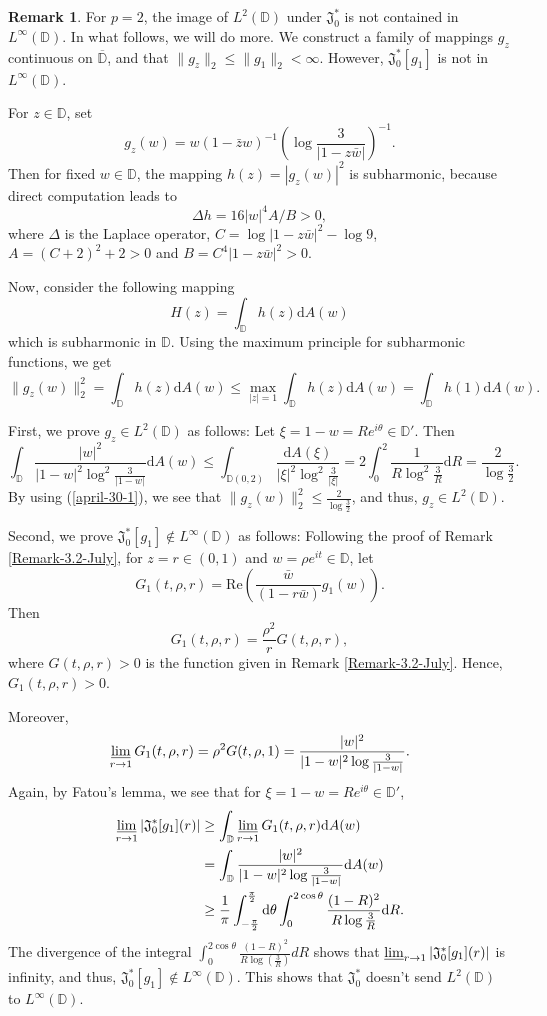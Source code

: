 \documentclass[a4paper,12pt]{amsart}
\theoremstyle{definition}
\newtheorem{rem}{Remark}[section]%
\numberwithin{equation}{section}
\newcommand{\ID}{{\mathbb D}}
\def\be{\begin{equation}}
\def\ee{\end{equation}}
\begin{document}
\begin{rem}\label{rem3.2}
For $p=2$, the image of $L^2(\ID)$ under $\mathfrak{J}_0^*$ is not contained in $L^{\infty}(\ID)$. In what follows, we will do more.
We construct a family of mappings $g_z$ continuous on $\overline{\ID}$, and that $\|g_z\|_2\leq\|g_1\|_2<\infty$. However,
$\mathfrak{J}_0^*[g_1]$ is not in $L^{\infty}(\ID)$.

For $z\in\ID$, set
$$g_z(w) = w(1-\bar{z} w)^{-1} \left(\log \frac{3}{|1-z\bar w|}\right)^{-1}.$$
Then for fixed $w\in\ID$, the mapping $h(z)= |g_z(w)|^2 $ is subharmonic, because direct computation leads to
$$\Delta h=16|w|^4A/B>0,$$
where $\Delta$ is the Laplace operator,
$C=\log|1-z\bar{w}|^2-\log9$, $A=(C+2)^2+2>0$ and $B=C^4|1-z\bar{w}|^2>0$.

Now, consider the following mapping
$$H(z)=\int_{\mathbb{D}} h(z) \mathrm{d}A(w) $$
which is subharmonic in $\ID$. Using the maximum principle for subharmonic functions, we get
\be\label{april-30-1} \|g_z(w)\|^2_{2}=\int_{\mathbb{D}} h(z) \mathrm{d}A(w) \le \max_{|z|=1} \int_{\mathbb{D}} h(z) \mathrm{d}A(w) =\int_{\mathbb{D}}h(1)\mathrm{d}A(w) . \ee

First, we prove $g_z\in L^2(\ID)$ as follows:
Let $\xi=1-w=Re^{i\theta}\in\ID'$. Then
$$\int_{\mathbb{D}}\frac{{|w|^2}}{|1-w|^2\log^2 \frac{3}{|1-w|}}\mathrm{d}A(w) \leq\int_{\ID(0, 2)}\frac{\mathrm{d}A(\xi)}{|\xi|^2\log^2\frac{3}{|\xi|}}=2\int_0^2\frac{1}{R\log^2\frac{3}{R}}\mathrm{d}R=\frac{2}{\log\frac{3}{2}}.$$
By using (\ref{april-30-1}), we see that $\|g_z(w)\|^2_{2}\leq\frac{2}{\log\frac{3}{2}}$, and thus,  $g_z\in L^2(\ID)$.

Second, we prove $\mathfrak{J}_0^*[g_1]\notin L^{\infty}(\ID)$ as follows: Following the proof of Remark \ref{Remark-3.2-July},
for $z=r\in(0, 1)$ and $w=\rho e^{it}\in\ID$, let
$$G_1(t, \rho, r) =\text{Re}\left(\frac{\bar{w}}{(1-r\bar{w})}g_1(w)\right).$$
Then
$$ G_1(t, \rho, r)=\frac{\rho^2}{r}G(t, \rho, r),$$
where $G(t, \rho, r)>0$ is the function given in Remark \ref{Remark-3.2-July}. Hence,
$G_1(t, \rho, r)>0$.

Moreover,
$$\varliminf_{r\to 1}G_1(t,\rho,r)=\rho^2G(t, \rho, 1)=\frac{|w|^2}{|1-w|^2\log\frac{3}{|1-w|}}.$$
Again, by Fatou's lemma, we see that for $\xi=1-w=Re^{i\theta}\in\ID'$,
\begin{align*}
  \varliminf_{r\to 1}|\mathfrak{J}_0^*[g_1](r)| &\geq\int_{\ID}\varliminf_{r\to 1}G_1(t,\rho,r)\mathrm{d}A(w) \\
  &=\int_{\mathbb{D}}\frac{{|w|^2}}{|1-w|^2\log \frac{3}{|1-w|}}\mathrm{d}A(w) \\
  &\geq\frac{1}{\pi}\int_{-\frac{\pi}{2}}^{\frac{\pi}{2}}\mathrm{d}\theta\int_0^{2\cos \theta}\frac{(1-R)^2}{R\log\frac{3}{R}}\mathrm{d}R.
\end{align*}
The divergence of the integral $\int_0^{2\cos \theta}\frac{(1-R)^2}{R\log(\frac{3}{R})}dR$ shows that $\varliminf_{r\to 1}|\mathfrak{J}_0^*[g_1](r)|$
is infinity, and thus, $\mathfrak{J}_0^*[g_1]\notin L^{\infty}(\ID)$. This shows that $\mathfrak{J}_0^*$ doesn't send $L^2(\ID)$ to
$L^{\infty}(\ID)$.
\end{rem}
\end{document}
